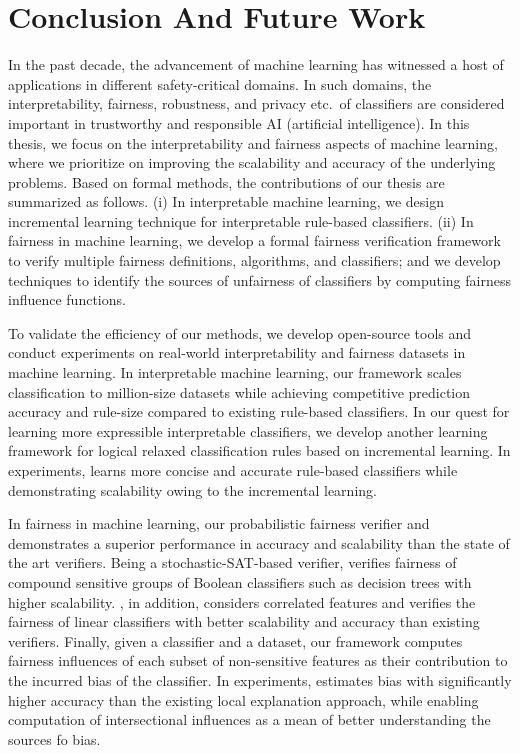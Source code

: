 \chapter{Conclusion And Future Work}
\label{chapter:conclusion} 
In the past decade, the advancement of machine learning has witnessed a host of  applications in different safety-critical domains. In such domains, the interpretability, fairness, robustness, and privacy etc.\ of classifiers are considered important in trustworthy and responsible AI (artificial intelligence). In this thesis, we focus on the interpretability and fairness aspects of machine learning, where we prioritize on improving the scalability and accuracy of the underlying problems. Based on formal methods, the contributions of our thesis are summarized as follows. (i) In interpretable machine learning, we design incremental learning technique for interpretable rule-based classifiers. (ii) In fairness in machine learning, we develop a formal fairness verification framework to verify multiple fairness definitions, algorithms, and classifiers; and we develop techniques to identify the sources of unfairness of classifiers by computing fairness influence functions.


To validate the efficiency of our methods, we develop open-source tools and conduct experiments on real-world interpretability and fairness datasets in machine learning. In interpretable machine learning, our framework {\imli} scales classification to million-size datasets while achieving competitive prediction accuracy and rule-size compared to existing rule-based classifiers. In our quest for learning more expressible interpretable classifiers, we develop another learning framework {\crr} for logical relaxed classification rules based on incremental learning. In experiments, {\crr} learns more concise and accurate rule-based classifiers while demonstrating scalability owing to the incremental learning. 


In fairness in machine learning, our probabilistic fairness verifier {\justicia} and {\fvgm} demonstrates a superior performance in accuracy and scalability than the state of the art verifiers. Being a stochastic-SAT-based verifier, {\justicia} verifies fairness of compound sensitive groups of Boolean classifiers such as decision trees with higher scalability. {\fvgm}, in addition, considers correlated features and verifies the fairness of linear classifiers with better scalability and accuracy than existing verifiers. Finally, given a classifier and a dataset, our framework {\fairXplainer} computes fairness influences of each subset of non-sensitive features as their contribution to the incurred bias of the classifier. In experiments, {\fairXplainer} estimates bias with significantly higher accuracy than the existing local explanation approach, while enabling computation of intersectional influences as a mean of better understanding the sources fo bias.

